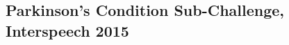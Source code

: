 \documentclass{article}
\begin{document}
 \subsection{Parkinson's Condition Sub-Challenge, Interspeech 2015}
%
%
%
%
\end{document}
